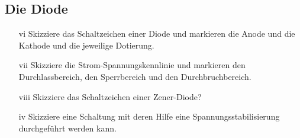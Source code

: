 \subsection*{Die Diode}

\begin{enumerate}
\itemsep1pt\parskip0pt
\item[vi] Skizziere das Schaltzeichen einer Diode und markieren die Anode und die Kathode und die jeweilige Dotierung.
\item[vii] Skizziere die Strom-Spannungskennlinie und markieren den Durchlassbereich, den Sperrbereich und den Durchbruchbereich.
\item[viii] Skizziere das Schaltzeichen einer Zener-Diode?
\item[iv] Skizziere eine Schaltung mit deren Hilfe eine Spannungsstabilisierung durchgeführt werden kann.
\end{enumerate}

